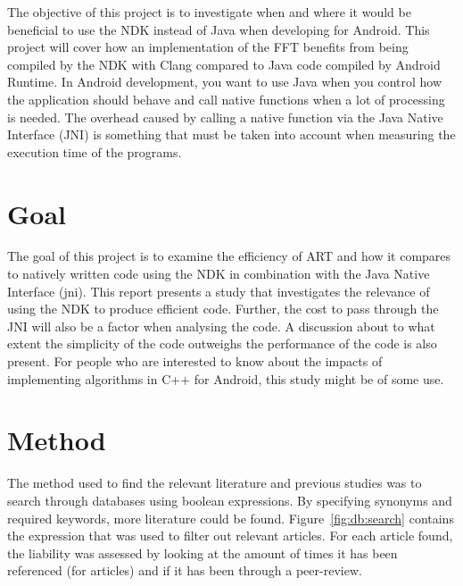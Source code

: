 The objective of this project is to investigate when and where it would be beneficial to use the NDK instead of Java when developing for Android. This project will cover how an implementation of the FFT benefits from being compiled by the NDK with Clang compared to Java code compiled by Android Runtime. In Android development, you want to use Java when you control how the application should behave and call native functions when a lot of processing is needed. The overhead caused by calling a native function via the Java Native Interface (JNI) is something that must be taken into account when measuring the execution time of the programs.

\section{Goal}
The goal of this project is to examine the efficiency of ART and how it compares to natively written code using the NDK in combination with the Java Native Interface (\gls{jni}). This report presents a study that investigates the relevance of using the NDK to produce efficient code. Further, the cost to pass through the JNI will also be a factor when analysing the code. A discussion about to what extent the simplicity of the code outweighs the performance of the code is also present. For people who are interested to know about the impacts of implementing algorithms in C++ for Android, this study might be of some use.

\section{Method}

The method used to find the relevant literature and previous studies was to search through databases using boolean expressions. By specifying synonyms and required keywords, more literature could be found. Figure~\ref{fig:db:search} contains the expression that was used to filter out relevant articles. For each article found, the liability was assessed by looking at the amount of times it has been referenced (for articles) and if it has been through a peer-review.

